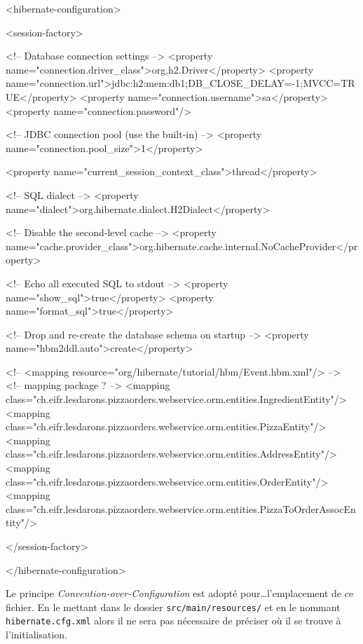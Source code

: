 \begin{xmlcode}
<hibernate-configuration>

    <session-factory>

        <!-- Database connection settings -->
        <property name="connection.driver_class">org.h2.Driver</property>
        <property name="connection.url">jdbc:h2:mem:db1;DB_CLOSE_DELAY=-1;MVCC=TRUE</property>
        <property name="connection.username">sa</property>
        <property name="connection.password"/>

        <!-- JDBC connection pool (use the built-in) -->
        <property name="connection.pool_size">1</property>

        <property name="current_session_context_class">thread</property>

        <!-- SQL dialect -->
        <property name="dialect">org.hibernate.dialect.H2Dialect</property>

        <!-- Disable the second-level cache  -->
        <property name="cache.provider_class">org.hibernate.cache.internal.NoCacheProvider</property>

        <!-- Echo all executed SQL to stdout -->
        <property name="show_sql">true</property>
        <property name="format_sql">true</property>

        <!-- Drop and re-create the database schema on startup -->
        <property name="hbm2ddl.auto">create</property>

        <!--
        <mapping resource="org/hibernate/tutorial/hbm/Event.hbm.xml"/>
        -->
        <!-- mapping package ? -->
        <mapping class="ch.eifr.lesdarons.pizzaorders.webservice.orm.entities.IngredientEntity"/>
        <mapping class="ch.eifr.lesdarons.pizzaorders.webservice.orm.entities.PizzaEntity"/>
        <mapping class="ch.eifr.lesdarons.pizzaorders.webservice.orm.entities.AddressEntity"/>
        <mapping class="ch.eifr.lesdarons.pizzaorders.webservice.orm.entities.OrderEntity"/>
        <mapping class="ch.eifr.lesdarons.pizzaorders.webservice.orm.entities.PizzaToOrderAssocEntity"/>

    </session-factory>

</hibernate-configuration>
\end{xmlcode}

Le principe \emph{Convention-over-Configuration} est adopté pour\dots l'emplacement de ce fichier.
En le mettant dans le dossier \verb|src/main/resources/| et en le nommant \verb|hibernate.cfg.xml|
alors il ne sera pas nécessaire de préciser où il se trouve à l'initialisation.

